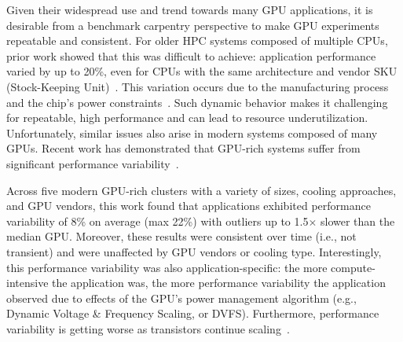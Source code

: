 Given their widespread use and trend towards many GPU applications, it is desirable from a benchmark carpentry perspective to make GPU experiments repeatable and consistent.
For older HPC systems composed of multiple CPUs, prior work showed that this was difficult to achieve: application performance varied by up to 20\%, even for CPUs with the same architecture and vendor SKU (Stock-Keeping Unit)~\cite{AcunLanger2016-power,chasapis2016runtime, ChasapisMoreto2019-powerEfficJobSched, InadomiPatki2015-scVar, PatelWagenhauser2020-hpcPowerConsump, SkinnerKramer2005-perfVarCauses}. This variation occurs due to the manufacturing process and the chip's power constraints~\cite{ChasapisMoreto2019-powerEfficJobSched,Scogland2015-pwrPerspectives}.
Such dynamic behavior makes it challenging for %
repeatable, high performance and can lead to resource underutilization.
Unfortunately, similar issues also arise in modern systems composed of many GPUs.
Recent work has demonstrated that GPU-rich systems suffer from significant performance variability~\cite{DeBardeleben-LBNL-EuroPar13, Fraternali-EEHPCVar-2018, Scogland2015-pwrPerspectives, sinha2022notall}.

Across five modern GPU-rich clusters with a variety of sizes, cooling approaches, and GPU vendors, this work found that applications exhibited performance variability of 8\% on average (max 22\%) with outliers up to 1.5$\times$ slower than the median GPU.
Moreover, these results were consistent over time (i.e., not transient) and were unaffected by GPU vendors or cooling type.
Interestingly, this performance variability was also application-specific: the more compute-intensive the application was, the more performance variability the application observed due to effects of the GPU's power management algorithm (e.g., Dynamic Voltage \& Frequency Scaling, or DVFS).
Furthermore, performance variability is getting worse as transistors continue scaling~\cite{DRAMthermalissues}.

